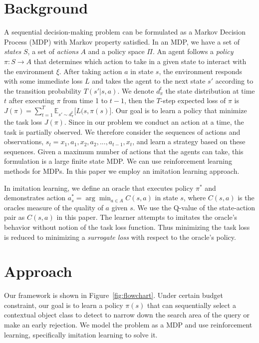 \section{Background}
A sequential decision-making problem can be formulated as a Markov Decision Process (MDP) with Markov property satisfied. In an MDP, we have a set of \textit{states} $S$, a set of \textit{actions} $A$ and a policy space $\Pi$. An agent follows a \textit{policy} $\pi: S \rightarrow A$ that determines which action to take in a given state to interact with the environment $\xi$. After taking action $a$ in state $s$, the environment responds with some immediate loss $L$ and takes the agent to the next state $s'$ according to the transition probability $T(s'|s,a)$. We denote $d_\pi^t$ the state distribution at time $t$ after executing $\pi$ from time 1 to $t-1$, then the $T$-step expected loss of $\pi$ is $J(\pi) = \sum_{t=1}^T \mathbb{E}_{s'\sim d_\pi^t} \big[L(s, \pi(s)\big]  $.  Our goal is to learn a policy that minimize the task loss $J(\pi)$. Since in our problem we conduct an action at a time, the task is partially observed. We therefore consider the sequences of actions and observations, $s_t = x_1, a_1, x_2, a_2, ..., a_{t-1}, x_t$, and learn a strategy based on these sequences. Given a maximum number of actions that the agents can take, this formulation is a large finite state MDP. We can use reinforcement learning methods for MDPs. In this paper we employ an imitation learning approach.

In imitation learning, we define an oracle that executes policy $\pi^*$ and demonstrates action $a_s^* = \arg \min_{a\in A} C(s,a)$ in state $s$, where $C(s,a)$ is the oracles measure of the quality of $a$ given $s$. We use the Q-value of the state-action pair as $C(s,a)$ in this paper. The learner attempts to imitates the oracle's behavior without notion of the task loss function. Thus minimizing the task loss is reduced to minimizing a \textit{surrogate loss} with respect to the oracle's policy.


\section{Approach}

Our framework is shown in Figure~\ref{fig:flowchart}. %
Under certain budget constraint, our goal is to learn a policy $\pi(s)$ that can sequentially select a contextual object class to detect  to narrow down the search area of the query or
make an early rejection. We model the problem as a MDP and use reinforcement learning, specifically imitation learning to solve it. %

